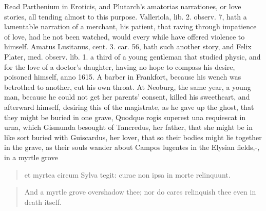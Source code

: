 Read Parthenium in Eroticis, and Plutarch's amatorias narrationes, or
love stories, all tending almost to this purpose. Valleriola, lib. 2.
observ. 7, hath a lamentable narration of a merchant, his patient,
 that raving through impatience of love, had he not been watched,
would every while have offered violence to himself. Amatus Lusitanus,
cent. 3. car. 56, hath such another story, and Felix Plater, med.
observ. lib. 1. a third of a young gentleman that studied physic,
and for the love of a doctor's daughter, having no hope to compass his
desire, poisoned himself, anno 1615. A barber in Frankfort,
because his wench was betrothed to another, cut his own throat.
At Neoburg, the same year, a young man, because he could not get
her parents' consent, killed his sweetheart, and afterward himself,
desiring this of the magistrate, as he gave up the ghost, that they
might be buried in one grave, Quodque rogis superest una requiescat in
urna, which  Gismunda besought of Tancredus, her father, that she
might be in like sort buried with Guiscardus, her lover, that so their
bodies might lie together in the grave, as their souls wander about
Campos lugentes in the Elysian fields,-, in a myrtle grove

\begin{latin}
\begin{verse}
et myrtea circum
Sylva tegit: curae non ipsa in morte relinquunt.
\end{verse}
\end{latin}
\translationrule%
\begin{verse}%
And a myrtle grove overshadow thee;
nor do cares relinquish thee even in death itself.
\end{verse}%

